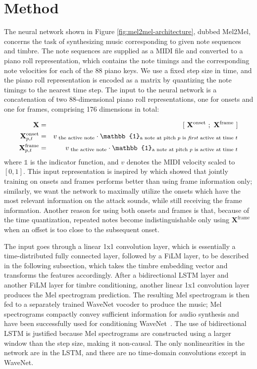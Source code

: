\section{Method}\label{sec:method}

The neural network shown in Figure \ref{fig:mel2mel-architecture}, dubbed Mel2Mel, concerns the task of synthesizing music corresponding to given note sequences and timbre.
The note sequences are supplied as a MIDI file and converted to a piano roll representation, which contains the note timings and the corresponding note velocities for each of the 88 piano keys.
We use a fixed step size in time, and the piano roll representation is encoded as a matrix by quantizing the note timings to the nearest time step.
The input to the neural network is a concatenation of two 88-dimensional piano roll representations, one for onsets and one for frames, comprising 176 dimensions in total:

\begin{eqnarray*}
	\mathbf{X} & =&  [~ \mathbf{X}^{\textrm{onset}} ~;~ \mathbf{X}^{\textrm{frame}} ~] \\
	\mathbf{X}^{\textrm{onset}}_{p,t} &= & v_{\textrm{~the active note}} \cdot \mathbb{1}_{\textrm{a note at pitch $p$ is \textit{first} active at time $t$}} \\
	\mathbf{X}^{\textrm{frame}}_{p,t} &= & v_{\textrm{~the active note}} \cdot \mathbb{1}_{\textrm{a note at pitch $p$ is active at time $t$}}
\end{eqnarray*}
\noindent where $\mathbb{1}$ is the indicator function, and $v$ denotes the MIDI velocity scaled to $[0, 1]$.
This input representation is inspired by \cite{hawthorne2018onsetsframes} which showed that jointly training on onsets and frames performs better than using frame information only;
similarly, we want the network to maximally utilize the onsets which have the most relevant information on the attack sounds, while still receiving the frame information.
Another reason for using both onsets and frames is that, because of the time quantization, repeated notes become indistinguishable only using $\mathbf{X}^\textrm{frame}$ when an offset is too close to the subsequent onset.

The input goes through a linear 1x1 convolution layer, which is essentially a time-distributed fully connected layer, followed by a FiLM layer, to be described in the following subsection, which takes the timbre embedding vector and transforms the features accordingly.
After a bidirectional LSTM layer and another FiLM layer for timbre conditioning, another linear 1x1 convolution layer produces the Mel spectrogram prediction.
The resulting Mel spectrogram is then fed to a separately trained WaveNet vocoder to produce the music; Mel spectrograms compactly convey sufficient information for audio synthesis and have been successfully used for conditioning WaveNet~\cite{shen2018tacotron,ping2018deepvoice3}.
The use of bidirectional LSTM is justified because Mel spectrograms are constructed using a larger window than the step size, making it non-causal.
The only nonlinearities in the network are in the LSTM, and there are no time-domain convolutions except in WaveNet.


